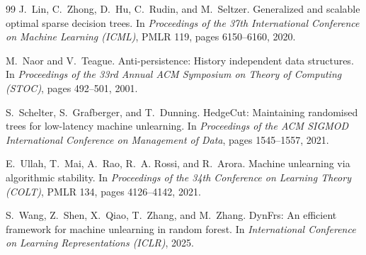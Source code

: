 \documentclass[11pt]{article}
\theoremstyle{definition}
\begin{document}
\begin{thebibliography}{99}
J.~Lin, C.~Zhong, D.~Hu, C.~Rudin, and M.~Seltzer.
\newblock Generalized and scalable optimal sparse decision trees.
\newblock In \emph{Proceedings of the 37th International Conference on Machine Learning (ICML)}, PMLR 119, pages 6150--6160, 2020.

M.~Naor and V.~Teague.
\newblock Anti-persistence: History independent data structures.
\newblock In \emph{Proceedings of the 33rd Annual ACM Symposium on Theory of Computing (STOC)}, pages 492--501, 2001.

S.~Schelter, S.~Grafberger, and T.~Dunning.
\newblock HedgeCut: Maintaining randomised trees for low-latency machine unlearning.
\newblock In \emph{Proceedings of the ACM SIGMOD International Conference on Management of Data}, pages 1545--1557, 2021.

E.~Ullah, T.~Mai, A.~Rao, R.~A. Rossi, and R.~Arora.
\newblock Machine unlearning via algorithmic stability.
\newblock In \emph{Proceedings of the 34th Conference on Learning Theory (COLT)}, PMLR 134, pages 4126--4142, 2021.

S.~Wang, Z.~Shen, X.~Qiao, T.~Zhang, and M.~Zhang.
\newblock DynFrs: An efficient framework for machine unlearning in random forest.
\newblock In \emph{International Conference on Learning Representations (ICLR)}, 2025.

\end{thebibliography}
\end{document}
